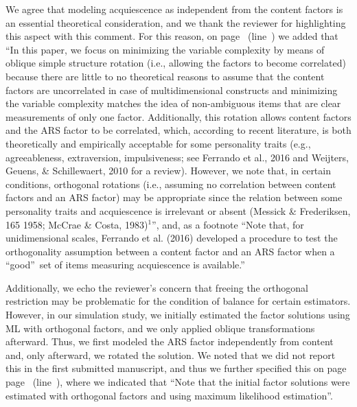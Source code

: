 \documentclass[a4paper]{article}
\begin{document}
We agree that modeling acquiescence as independent from the content factors is an essential theoretical consideration, and we thank the reviewer for highlighting this aspect with this comment. For this reason, on page~\pageref{refpage:R2Mj3a} (line~) we added that \textquotedblleft In this paper, we focus on minimizing the variable complexity by means of oblique simple structure rotation (i.e., allowing the factors to become correlated) because there are little to no theoretical reasons to assume that the content factors are uncorrelated in case of multidimensional constructs and minimizing the variable complexity matches the idea of non-ambiguous items that are clear measurements of only one factor. Additionally, this rotation allows content factors and the ARS factor to be correlated, which, according to recent literature, is both theoretically and empirically acceptable for some personality traits (e.g., agreeableness, extraversion, impulsiveness; see Ferrando et al., 2016 and Weijters, Geuens, \& Schillewaert, 2010 for a review). However, we note that, in certain conditions, orthogonal rotations (i.e., assuming no correlation between content factors and an ARS factor) may be appropriate since the relation between some personality traits and acquiescence is irrelevant or absent (Messick \& Frederiksen,
165 1958; McCrae \& Costa, 1983)$^{1}$\textquotedblright, and, as a footnote \textquotedblleft Note that, for unidimensional scales, Ferrando et al. (2016) developed a procedure to test the orthogonality assumption between a content factor and an ARS factor when a \textquotedblleft good\textquotedblright\, set of items measuring acquiescence is available.\textquotedblright 

Additionally, we echo the reviewer's concern that freeing the orthogonal restriction may be problematic for the condition of balance for certain estimators. However, in our simulation study, we initially estimated the factor solutions using ML with orthogonal factors, and we only applied oblique transformations afterward. Thus, we first modeled the ARS factor independently from content and, only afterward, we rotated the solution. We noted that we did not report this in the first submitted manuscript, and thus we further specified this on  page page~\pageref{refpage:R2Mj3b} (line~), where we indicated that \textquotedblleft Note that the initial factor solutions were estimated with orthogonal factors and using maximum likelihood estimation\textquotedblright.
\end{document}
